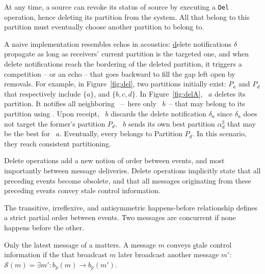 

At any time, a source can revoke its status of source by executing a
\texttt{Del} operation, hence deleting its partition from the
system. All \processes that belong to this partition must eventually
choose another partition to belong to.



A naive implementation resembles echos in acoustics:
\underline{d}elete notifications $\delta$ propagate as long as
receivers' current partition is the targeted one, and when delete
notifications reach the bordering \processes of the deleted partition,
it triggers a competition -- or an echo -- that goes backward to fill
the gap left open by removals.  For example, in Figure~\ref{fig:del},
two partitions initially exist: $P_a$ and $P_d$ that respectively
include $\{a\}$, and $\{b, c, d\}$. In Figure~\ref{fig:delA},
\Process~$a$ deletes its partition. It notifies all neighboring
\processes~--~here only \Process~$b$~-- that may belong to its
partition using \NAMEB. Upon receipt, \Process~$b$ discards the delete
notification $\delta_a$ since $\delta_a$ does not target the former's
partition $P_d$. \Process~$b$ sends its own best partition
$\alpha_d^3$ that may be the best for \Process~$a$. Eventually, every
\process belongs to Partition $P_d$. In this scenario, they reach
consistent partitioning.

Delete operations add a new notion of order between events, and most
importantly between message deliveries. Delete operations implicitly
state that all preceding events become obsolete, and that all messages
originating from these preceding events convey stale control
information.




\begin{definition}
  The transitive, irreflexive, and antisymmetric happens-before
  relationship defines a strict partial order between events. Two
  messages are concurrent if none happens before the other.
\end{definition}

\begin{definition}
  Only the latest message of a \process matters. A message $m$ conveys
  \underline{s}tale control information if the \process that broadcast
  $m$ later broadcast another message $m'$: $\mathcal{S}(m)
  = \exists m': b_p(m) \rightarrow b_p(m')$.

\end{definition}

